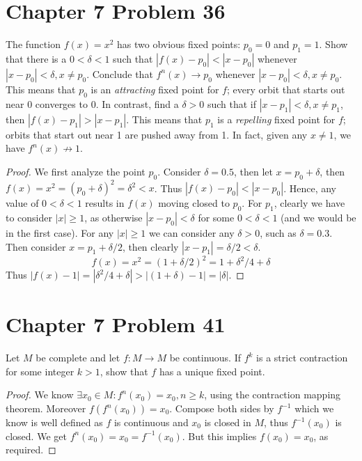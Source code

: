 \documentclass{article}
\newtheorem{proof}{Proof}
\def\ge{\geqslant}
\def\to{\rightarrow}
\begin{document}
\section{Chapter 7 Problem 36} The function $f(x)=x^2$ has two obvious
fixed points: $p_0=0$ and $p_1=1$. Show that there is a $0<\delta<1$
such that $|f(x)-p_0|<|x-p_0|$ whenever $|x-p_0|<\delta, x\ne p_0$.
Conclude that $f^n(x)\to p_0$ whenever $|x-p_0|<\delta, x\ne p_0$.
This means that $p_0$ is an \emph{attracting} fixed point for $f$; every
orbit that starts out near 0 converges to 0. In contrast, find a $\delta>0$
such that if $|x-p_1|<\delta, x\ne p_1$, then $|f(x)-p_1|>|x-p_1|$.
This means that $p_1$ is a \emph{repelling} fixed point for $f$;
orbits that start out near 1 are pushed away from 1. In fact, given any
$x\ne 1$, we have $f^n(x)\not\to 1$.
\begin{proof}
We first analyze the point $p_0$.
Consider $\delta=0.5$, then let $x=p_0+\delta$, then
$f(x)=x^2=(p_0+\delta)^2=\delta^2 < x$. Thus
$|f(x)-p_0|<|x-p_0|$. Hence, any value of $0<\delta<1$ results
in $f(x)$ moving closed to $p_0$.
 For $p_1$, clearly we have to consider $|x|\ge 1$, 
as otherwise $|x-p_0|<\delta$
for some $0<\delta<1$ (and we would be in the first case). For any $|x|\ge 1$
we can consider any $\delta>0$, such as $\delta=0.3$. Then
consider $x=p_1+\delta/2$, then clearly $|x-p_1|=\delta/2<\delta$.
\[
f(x)=x^2=(1+\delta/2)^2=1+\delta^2/4+\delta
\]
Thus $|f(x)-1|=|\delta^2/4+\delta| > |(1+\delta)-1|=|\delta|$.

\end{proof}
\section{Chapter 7 Problem 41}
Let $M$ be complete  and let $f:M\to M$ be continuous. If
$f^k$ is a strict contraction for some integer $k>1$, show that $f$
has a unique fixed point.
\begin{proof}
We know $\exists x_0\in M: f^n(x_0)=x_0, n\ge k$, 
using the contraction mapping theorem.
 Moreover $f(f^n(x_0))=x_0$. Compose both
sides by $f^{-1}$ which we know is well defined as $f$ is continuous
and $x_0$ is closed in $M$, thus $f^{-1}(x_0)$ is closed.
We get $f^n(x_0)=x_0=f^{-1}(x_0)$. But this implies
$f(x_0)=x_0$, as required.
\end{proof}
\end{document}
